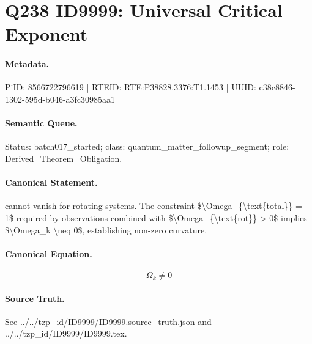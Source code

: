 \section*{Q238 ID9999: Universal Critical Exponent}
\paragraph{Metadata.}
PiID: 8566722796619 | RTEID: RTE:P38828.3376:T1.1453 | UUID: c38c8846-1302-595d-b046-a3fc30985aa1

\paragraph{Semantic Queue.}
Status: batch017\_started; class: quantum\_matter\_followup\_segment; role: Derived\_Theorem\_Obligation.

\paragraph{Canonical Statement.}
cannot vanish for rotating systems. The constraint \$\textbackslash{}Omega\_\{\textbackslash{}text\{total\}\} = 1\$ required by observations combined with \$\textbackslash{}Omega\_\{\textbackslash{}text\{rot\}\} > 0\$ implies \$\textbackslash{}Omega\_k \textbackslash{}neq 0\$, establishing non-zero curvature.

\paragraph{Canonical Equation.}
\[
\Omega_k \neq 0
\]

\paragraph{Source Truth.}
See ../../tzp\_id/ID9999/ID9999.source\_truth.json and ../../tzp\_id/ID9999/ID9999.tex.
